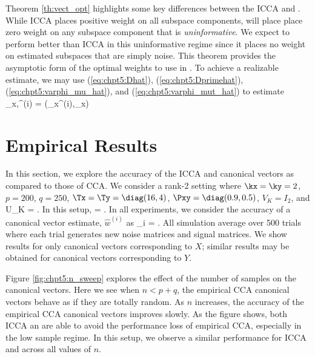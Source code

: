 Theorem \ref{th:vect_opt} highlights some key differences between the ICCA and \iccaps. While
ICCA places positive weight on all subspace components, \iccaps will place place zero
weight on any subspace component that is \textit{uninformative}. We expect \iccap to
perform better than ICCA in this uninformative regime since it places no weight on
estimated subspaces that are simply noise. This theorem provides the asymptotic form of
the optimal weights to use in \iccap. To achieve a realizable estimate, we may use (\ref{eq:chpt5:Dhat}), (\ref{eq:chpt5:Dprimehat}),
(\ref{eq:chpt5:varphi_mu_hat}), and (\ref{eq:chpt5:varphi_mut_hat}) to estimate
\be
\widehat{\lambda}_{x,}^{(i)} =
  \left(\widehat{\sigma}_x^{(i)},_x\right)
\ee

\section{Empirical Results}\label{sec:chpt5:emp}

In this section, we explore the accuracy of the ICCA and \iccap canonical vectors as
compared to those of CCA. We consider a rank-2 setting where $\kx=\ky=2$, $p=200$, $q=250$,
$\Tx=\Ty=\diag(16,4)$, $\Pxy=\diag(0.9,0.5)$, $V_K=I_2$, and
\beq\label{eq:chpt5:uk}
U_K = \left[\begin{array}{cc} 1 & -2 \\ 2 & 1\end{array}\right].
\eeq
In this setup,
\be
\Uktil = \left[\begin{array}{cc} -0.8559 & -0.5172 \\ -0.5172 & 0.8559\end{array}\right].
\ee
In all experiments, we consider the accuracy of a canonical vector estimate, $\widehat{w}^{(i)}$ as
\beq\label{eq:chpt5:cca_vect_acc}
_i = .
\eeq
All simulation average over 500 trials where each trial generates new noise matrices and
signal matrices. We show results for only canonical vectors corresponding to $X$; similar
results may be obtained for canonical vectors corresponding to $Y$. 

Figure \ref{fig:chpt5:n_sweep} explores the effect of the number of samples on the
canonical vectors. Here we see when $n<p+q$, the empirical CCA canonical vectors behave as
if they are totally random. As $n$ increases, the accuracy of the empirical CCA canonical
vectors improves slowly. As the figure shows, both ICCA an \iccap are able to avoid the
performance loss of empirical CCA, especially in the low sample regime. In this setup, we
observe a similar performance for ICCA and \iccap across all values of $n$. 

